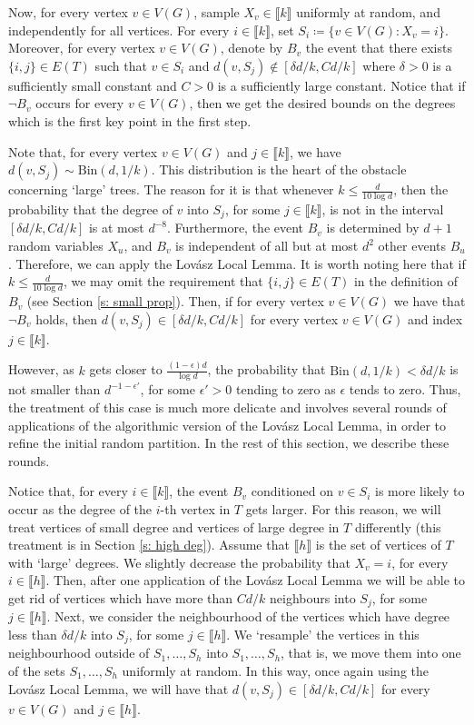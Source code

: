 \documentclass[notitlepage]{scrartcl}
\newcommand{\br}[1]{\llbracket{#1}\rrbracket}
\begin{document}
Now, for every vertex $v \in V(G)$, sample $X_v\in \br{k}$ uniformly at random, and independently for all vertices. For every $i \in \br{k}$, set $S_i \coloneqq \{v \in V(G) \colon X_v = i\}$. Moreover, for every vertex $v \in V(G)$, denote by $B_v$ the event that there exists $\{i, j\} \in E(T)$ such that $v \in S_i$ and $d(v, S_j) \notin [\delta d/k, C d/k]$ where $\delta>0$ is a sufficiently small constant and $C>0$ is a sufficiently large constant. Notice that if $\neg B_v$ occurs for every $v \in V(G)$, then we get the desired bounds on the degrees which is the first key point in the first step.

Note that, for every vertex $v \in V(G)$ and $j \in \br{k}$, we have $d(v, S_j) \sim \text{Bin}\left(d, 1/k\right)$. This distribution is the heart of the obstacle concerning `large' trees. The reason for it is that whenever $k \le \frac{d}{10\log d}$, then the probability that the degree of $v$ into $S_j$, for some $j \in \br{k}$, is not in the interval $[\delta d/k, C d/k]$ is at most $d^{-8}$. Furthermore, the event $B_v$ is determined by $d+1$ random variables $X_u$, and $B_v$ is independent of all but at most $d^2$ other events $B_u$. Therefore, we can apply the Lov\'asz Local Lemma. It is worth noting here that if $k\le \frac{d}{10\log d}$, we may omit the requirement that $\{i, j\} \in E(T)$ in the definition of $B_v$ (see Section \ref{s: small prop}). Then, if for every vertex $v \in V(G)$ we have that $\neg B_v$ holds, then $d(v, S_j) \in [\delta d/k, C d/k]$ for every vertex $v \in V(G)$ and index $j \in \br{k}$. 

However, as $k$ gets closer to $\frac{(1-\epsilon)d}{\log d}$, the probability that $\text{Bin}\left(d, 1/k\right) < \delta d/k$ is not smaller than $d^{-1-\epsilon'}$, for some $\epsilon' > 0$ tending to zero as $\epsilon$ tends to zero. Thus, the treatment of this case is much more delicate and involves several rounds of applications of the algorithmic version of the Lov\'asz Local Lemma, in order to refine the initial random partition. In the rest of this section, we describe these rounds.

Notice that, for every $i \in \br{k}$, the event $B_v$ conditioned on $v \in S_i$ is more likely to occur as the degree of the $i$-th vertex in $T$ gets larger. For this reason, we will treat vertices of small degree and vertices of large degree in $T$ differently (this treatment is in Section \ref{s: high deg}). Assume that $\br{h}$ is the set of vertices of $T$ with `large' degrees. We slightly decrease the probability that $X_v = i$, for every $i \in \br{h}$. Then, after one application of the Lov\'asz Local Lemma we will be able to get rid of vertices which have more than $C d/k$ neighbours into $S_j$, for some $j \in \br{h}$. Next, we consider the neighbourhood of the vertices which have degree less than $\delta d/k$ into $S_j$, for some $j \in \br{h}$. We `resample' the vertices in this neighbourhood outside of $S_1,\ldots, S_h$ into $S_1, \dots, S_h$, that is, we move them into one of the sets $S_1,\ldots, S_h$ uniformly at random. In this way, once again using the Lov\'asz Local Lemma, we will have that $d(v, S_j) \in [\delta d/k, C d/k]$ for every $v \in V(G)$ and $j \in \br{h}$.
\end{document}
